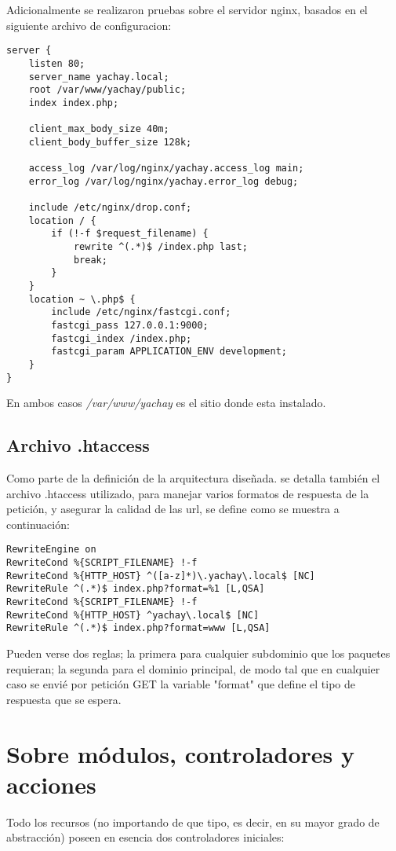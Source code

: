 Adicionalmente se realizaron pruebas sobre el servidor nginx, basados en el
siguiente archivo de configuracion:

\small
\begin{verbatim}
server {
    listen 80;
    server_name yachay.local;
    root /var/www/yachay/public;
    index index.php;

    client_max_body_size 40m;
    client_body_buffer_size 128k;

    access_log /var/log/nginx/yachay.access_log main;
    error_log /var/log/nginx/yachay.error_log debug;

    include /etc/nginx/drop.conf;
    location / {
        if (!-f $request_filename) {
            rewrite ^(.*)$ /index.php last;
            break;
        }
    }
    location ~ \.php$ {
        include /etc/nginx/fastcgi.conf;
        fastcgi_pass 127.0.0.1:9000;
        fastcgi_index /index.php;
        fastcgi_param APPLICATION_ENV development;
    }
}
\end{verbatim}

En ambos casos \emph{/var/www/yachay} es el sitio donde esta instalado.

\subsection{Archivo .htaccess}
Como parte de la definición de la arquitectura diseñada. se detalla también el
archivo .htaccess utilizado, para manejar varios formatos de respuesta de la
petición, y asegurar la calidad de las url, se define como se muestra a
continuación:

\begin{verbatim}
RewriteEngine on
RewriteCond %{SCRIPT_FILENAME} !-f
RewriteCond %{HTTP_HOST} ^([a-z]*)\.yachay\.local$ [NC]
RewriteRule ^(.*)$ index.php?format=%1 [L,QSA]
RewriteCond %{SCRIPT_FILENAME} !-f
RewriteCond %{HTTP_HOST} ^yachay\.local$ [NC]
RewriteRule ^(.*)$ index.php?format=www [L,QSA]
\end{verbatim}

Pueden verse dos reglas; la primera para cualquier subdominio que los paquetes
requieran; la segunda para el dominio principal, de modo tal que en cualquier
caso se envié por petición GET la variable "format" que define el tipo de
respuesta que se espera.

\section{Sobre módulos, controladores y acciones}
Todo los recursos (no importando de que tipo, es decir, en su mayor grado de
abstracción) poseen en esencia dos controladores iniciales:

